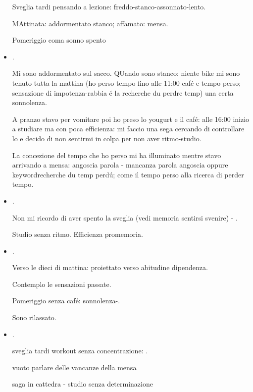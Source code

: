 \begin{itemize}
Sveglia tardi pensando a lezione: freddo-stanco-assonnato-lento.

MAttinata: addormentato stanco; affamato: mensa.

Pomeriggio coma sonno spento

\item {}.

Mi sono addormentato sul sacco. QUando  sono stanco: niente bike mi sono tenuto tutta la mattina (ho perso tempo fino alle 11:00 caf\'e e tempo perso; sensazione di impotenza-rabbia \'e la recherche du perdre temp) una certa sonnolenza.

A pranzo stavo per vomitare poi ho preso lo yougurt e il caf\'e: alle 16:00 inizio a studiare ma con poca efficienza: mi faccio una sega cercando di controllare lo  e decido di non sentirmi in colpa per non aver ritmo-studio. 

La concezione del tempo che ho perso mi ha illuminato mentre stavo arrivando a mensa: angoscia parola - mancanza parola angoscia oppure keyword{recherche du temp perd\'u}; come il tempo perso alla ricerca di perder tempo.

\item {}.

Non mi ricordo di aver spento la sveglia (vedi memoria sentirsi svenire) - .

Studio senza ritmo. Efficienza promemoria.



\item {}.

Verso le dieci di mattina: proiettato verso abitudine dipendenza.

Contemplo le sensazioni passate.

Pomeriggio senza caf\'e: sonnolenza-.

Sono rilassato.


\item {}.

sveglia tardi workout senza concentrazione: .

vuoto parlare delle vancanze della mensa

saga in cattedra - studio senza determinazione


\end{itemize}
